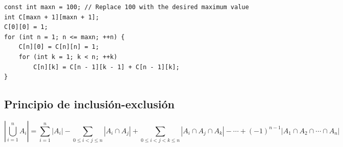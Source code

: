 \documentclass[11 pt]{article}
\begin{document}
\begin{verbatim}
const int maxn = 100; // Replace 100 with the desired maximum value
int C[maxn + 1][maxn + 1];
C[0][0] = 1;
for (int n = 1; n <= maxn; ++n) {
    C[n][0] = C[n][n] = 1;
    for (int k = 1; k < n; ++k)
        C[n][k] = C[n - 1][k - 1] + C[n - 1][k];
}
\end{verbatim}

\subsection{Principio de inclusión-exclusión}

\[ \left\lvert \bigcup_{i=1}^n A_i \right\rvert = \sum_{i=1}^{n} \left\lvert A_i \right\rvert - \sum_{0 \le i < j \le n} \left\lvert A_i \cap A_j \right\rvert + \sum_{0 \le i < j < k \le n} \left\lvert A_i \cap A_j \cap A_k \right\rvert - \cdots + (-1)^{n-1} \left\lvert A_1 \cap A_2 \cap \cdots \cap A_n \right\rvert
\]
\end{document}
